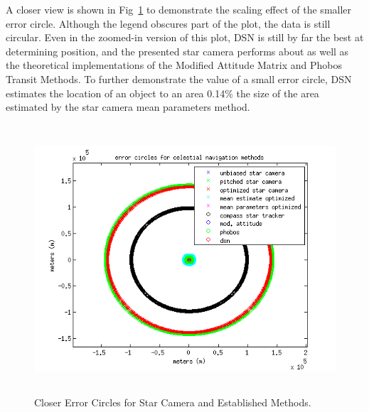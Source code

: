 \documentclass[12pt,a4paper]{book}
\begin{document}
A closer view is shown in Fig~\ref{f:errorCirclesClose} to demonstrate the scaling effect of the smaller error circle.  Although the legend obscures part of the plot, the data is still circular. Even in the zoomed-in version of this plot, DSN is still by far the best at determining position, and the presented star camera performs about as well as the theoretical implementations of the Modified Attitude Matrix and Phobos Transit Methods.  To further demonstrate the value of a small error circle, DSN estimates the location of an object to an area 0.14\% the size of the area estimated by the star camera mean parameters method.  
\begin{figure}[!ht]
\centering
\includegraphics[height=10cm]{errorCirclesClose.png}
\caption{Closer Error Circles for Star Camera and Established Methods.}\label{f:errorCirclesClose}
\end{figure}


\FloatBarrier
\end{document}
